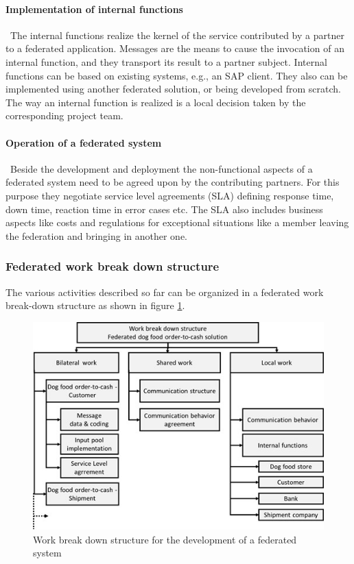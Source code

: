 \paragraph{Implementation of internal functions}\
The internal functions realize the kernel of the service contributed by a partner to a federated application. Messages are the means to cause the invocation of an internal function, and they transport its result to a partner subject. Internal functions can be based on existing systems, e.g., an SAP client.  They also can be implemented using another federated solution, or being developed from scratch. The way an internal function is realized is a local decision taken by the corresponding project team.

\paragraph{Operation of a federated system}\
Beside the development and deployment the non-functional aspects of a federated system need to be agreed upon by the contributing partners. For this purpose they negotiate service level agreements (SLA) defining response time, down time, reaction time in error cases etc. The SLA also includes business aspects like costs and regulations for exceptional situations like a member leaving the federation and bringing in another one.

\subsubsection{\textbf{Federated work break down structure}}
The various activities described so far can be organized in a federated work break-down structure as shown in figure \ref{fig:WBSDog}.

\begin{figure}[htbp]
	\centering
	\includegraphics[width=0.6\linewidth] {Figures/Chapter5/Project/WBSDog.jpg}
	\caption[Work break down structure for the development of a federated system]{Work break down structure for the development of a federated system}
	\label{fig:WBSDog}
\end{figure}

